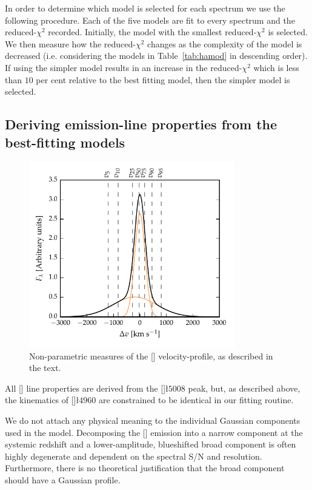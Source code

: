 In order to determine which model is selected for each spectrum we use the following procedure.  
Each of the five models are fit to every spectrum and the reduced-$\chi^2$ recorded.
Initially, the model with the smallest reduced-$\chi^2$ is selected. 
We then measure how the reduced-$\chi^2$ changes as the complexity of the model is decreased (i.e. considering the models in Table~\ref{tab:hamod} in descending order). 
If using the simpler model results in an increase in the reduced-$\chi^2$ which is less than $10$ per cent relative to the best fitting model, then the simpler model is selected.  

\subsection{Deriving emission-line properties from the best-fitting models}

\begin{figure}[t!]
    \centering
    \includegraphics[width=0.8\textwidth]{figures/chapter04/example_oiii.pdf} 
    \caption[{Non-parametric measures of the [] velocity-profile.}]{Non-parametric measures of the [] velocity-profile, as described in the text.}     
    \label{fig:example_oiii}
\end{figure}

All [] line properties are derived from the []\l$5008$ peak, but, as described above, the kinematics of []\l$4960$ are constrained to be identical in our fitting routine. 

We do not attach any physical meaning to the individual Gaussian components used in the model. 
Decomposing the [] emission into a narrow component at the systemic redshift and a lower-amplitude, blueshifted broad component is often highly degenerate and dependent on the spectral S/N and resolution. 
Furthermore, there is no theoretical justification that the broad component should have a Gaussian profile.  

